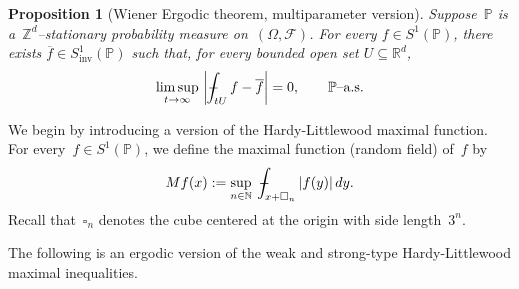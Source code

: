 \documentclass[11pt]{article} %
\let\oldsquare\square %
\renewcommand{\square}{\oldsquare}
\numberwithin{equation}{section}
\newtheorem{proposition}[theorem]{Proposition}
\theoremstyle{definition}
\let\originalleft\left
\let\originalright\right
\renewcommand{\left}{\mathopen{}\mathclose\bgroup\originalleft}
\renewcommand{\right}{\aftergroup\egroup\originalright}
\newcommand*{\N}{\ensuremath{\mathbb{N}}}
\newcommand*{\Zd}{\ensuremath{\mathbb{Z}^d}}
\newcommand*{\Rd}{\ensuremath{\mathbb{R}^d}}
\newcommand{\cu}{\square}
\newcommand{\F}{\mathcal{F}}
\renewcommand{\P}{\mathbb{P}}
\def\Xint#1{\mathchoice
{\XXint\displaystyle\textstyle{#1}}%
{\XXint\textstyle\scriptstyle{#1}}%
{\XXint\scriptstyle\scriptscriptstyle{#1}}%
{\XXint\scriptscriptstyle\scriptscriptstyle{#1}}%
\!\int}
\def\XXint#1#2#3{{\setbox0=\hbox{$#1{#2#3}{\int}$}
\vcenter{\hbox{$#2#3$}}\kern-.5\wd0}}
\def\fint{\Xint-}
\begin{document}
\begin{proposition}[Wiener Ergodic theorem, multiparameter version]
\label{p.ergodic}
Suppose~$\P$ is a~$\Zd$--stationary probability measure on~$(\Omega,\F)$. 
For every $f\in S^1(\P)$, there exists $\overline{f}\in S^1_{\mathrm{inv}}(\P)$ such that, for every bounded open set $U\subseteq \Rd$, 
\begin{equation}
\label{e.ergodic}
\limsup_{t\to\infty} \
\left| \fint_{tU} f - \overline{f} \right| = 0, 
\qquad 
\mbox{$\P$--a.s.}
\end{equation}
\end{proposition}


We begin by introducing a version of the Hardy-Littlewood maximal function. For every~$f \in S^1(\P)$, we define the maximal function (random field) of~$f$ by
\begin{equation}
Mf(x) := \sup_{n\in\N} \ \fint_{x+\cu_n} |f(y)|\,dy. 
\end{equation}
Recall that~$\cu_n$ denotes the cube centered at the origin with side length~$3^n$. 

\smallskip

The following is an ergodic version of the weak and strong-type Hardy-Littlewood maximal inequalities.
\end{document}
